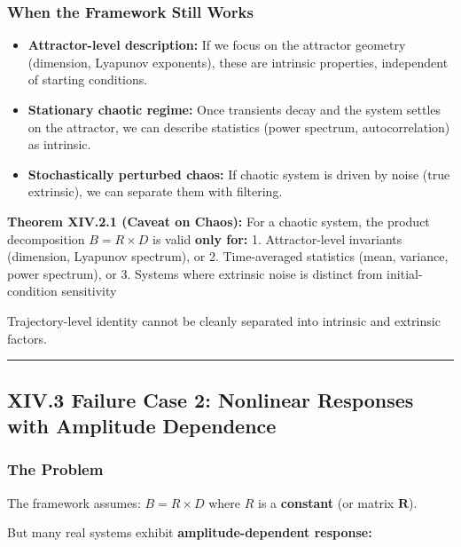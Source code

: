 \documentclass[
]{article}
\providecommand{\tightlist}{%
  \setlength{\itemsep}{0pt}\setlength{\parskip}{0pt}}
\begin{document}
\subsubsection{When the Framework Still
Works}\label{when-the-framework-still-works}

\begin{itemize}
\tightlist
\item
  \textbf{Attractor-level description:} If we focus on the attractor
  geometry (dimension, Lyapunov exponents), these are intrinsic
  properties, independent of starting conditions.
\item
  \textbf{Stationary chaotic regime:} Once transients decay and the
  system settles on the attractor, we can describe statistics (power
  spectrum, autocorrelation) as intrinsic.
\item
  \textbf{Stochastically perturbed chaos:} If chaotic system is driven
  by noise (true extrinsic), we can separate them with filtering.
\end{itemize}

\textbf{Theorem XIV.2.1 (Caveat on Chaos):} For a chaotic system, the
product decomposition \(B = R \times D\) is valid \textbf{only for:} 1.
Attractor-level invariants (dimension, Lyapunov spectrum), or 2.
Time-averaged statistics (mean, variance, power spectrum), or 3. Systems
where extrinsic noise is distinct from initial-condition sensitivity

Trajectory-level identity cannot be cleanly separated into intrinsic and
extrinsic factors.

\begin{center}\rule{0.5\linewidth}{0.5pt}\end{center}

\subsection{XIV.3 Failure Case 2: Nonlinear Responses with Amplitude
Dependence}\label{xiv.3-failure-case-2-nonlinear-responses-with-amplitude-dependence}

\subsubsection{The Problem}\label{the-problem-1}

The framework assumes: \(B = R \times D\) where \(R\) is a
\textbf{constant} (or matrix \(\mathbf{R}\)).

But many real systems exhibit \textbf{amplitude-dependent response:}
\end{document}
